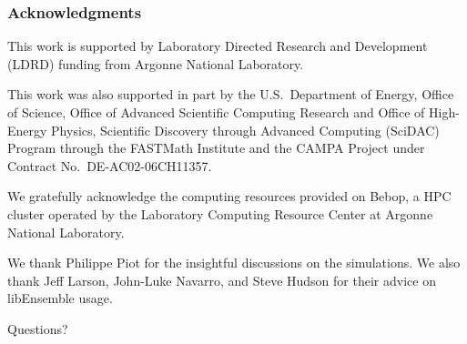 \documentclass[aspectratio=169]{beamer}
\begin{document}
\begin{frame}\frametitle{Acknowledgments}
\vfill 

This work is supported by Laboratory Directed Research and Development (LDRD) funding from Argonne National Laboratory.

\medskip

This work was also supported in part by the U.S.~Department of Energy, Office of
Science, Office of Advanced Scientific Computing Research and Office of
High-Energy Physics, Scientific Discovery through Advanced Computing (SciDAC)
Program through the FASTMath Institute and the CAMPA Project under Contract
No.~DE-AC02-06CH11357.

\medskip

We gratefully acknowledge the computing resources provided on Bebop, a HPC cluster operated by the Laboratory Computing Resource Center at Argonne National Laboratory.

\medskip

We thank Philippe Piot for the insightful discussions on the simulations.
We also thank Jeff Larson, John-Luke Navarro, and Steve Hudson for their advice on libEnsemble usage.

\end{frame}

\begin{frame}{Questions?}
  \tableofcontents
\end{frame}
\end{document}

